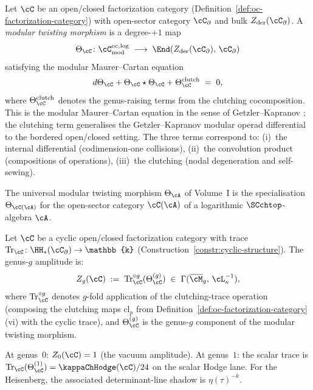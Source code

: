 \begin{definition}
\label{def:modular-twisting-morphism}
Let $\cC$ be an open/closed factorization category (Definition~\ref{def:oc-factorization-category}) with open-sector category $\cC_\partial$ and bulk $Z_{\mathrm{der}}(\cC_\partial)$. A \emph{modular twisting morphism} is a degree-$+1$ map
\[
\Theta_\cC \colon \cC^{\mathrm{oc,log}}_{\mathrm{mod}} \;\longrightarrow\; \End(Z_{\mathrm{der}}(\cC_\partial),\, \cC_\partial)
\]
satisfying the modular Maurer--Cartan equation
\[
d\Theta_\cC + \Theta_\cC \star \Theta_\cC + \Theta_\cC^{\mathrm{clutch}} \;=\; 0,
\]
where $\Theta_\cC^{\mathrm{clutch}}$ denotes the genus-raising terms from the clutching cocomposition. This is the modular Maurer--Cartan equation in the sense of Getzler--Kapranov \cite{GK98}; the clutching term generalises the Getzler--Kapranov modular operad differential to the bordered open/closed setting. The three terms correspond to: (i)~the internal differential (codimension-one collisions), (ii)~the convolution product (compositions of operations), (iii)~the clutching (nodal degeneration and self-sewing).

The universal modular twisting morphism $\Theta_\cA$ of Volume~I is the specialisation $\Theta_{\cC(\cA)}$ for the open-sector category $\cC(\cA)$ of a logarithmic $\SCchtop$-algebra $\cA$.
\end{definition}

\begin{theorem}
\label{thm:genus-g-traces}
Let $\cC$ be a cyclic open/closed factorization category with trace $\Tr_\cC \colon \HH_\ast(\cC_\partial) \to \mathbb{k}$ (Construction~\textup{\ref{constr:cyclic-structure}}). The genus-$g$ amplitude is:
\[
Z_g(\cC) \;:=\; \Tr_\cC^{\circ g}(\Theta_\cC^{(g)}) \;\in\; \Gamma(\overline{\cM}_g,\, \cL_\kappa^{-1}),
\]
where $\Tr_\cC^{\circ g}$ denotes $g$-fold application of the clutching-trace operation (composing the clutching maps $\mathrm{cl}_p$ from Definition~\textup{\ref{def:oc-factorization-category}(vi)} with the cyclic trace), and $\Theta_\cC^{(g)}$ is the genus-$g$ component of the modular twisting morphism.

At genus~$0$: $Z_0(\cC) = 1$ (the vacuum amplitude).
At genus~$1$: the scalar trace is
$\Tr_\cC(\Theta_\cC^{(1)})=\kappaChHodge(\cC)/24$ on the scalar
Hodge lane. For the Heisenberg, the associated determinant-line
shadow is $\eta(\tau)^{-k}$.
\end{theorem}

